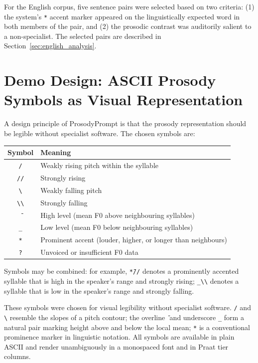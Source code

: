 For the English corpus, five sentence pairs were selected based on two
criteria: (1) the system's \texttt{*} accent marker appeared on the
linguistically expected word in both members of the pair, and (2) the prosodic
contrast was auditorily salient to a non-specialist. The selected pairs are
described in Section~\ref{sec:english_analysis}.

\section{Demo Design: ASCII Prosody Symbols as Visual Representation}
\label{sec:demo_design}

A design principle of ProsodyPrompt is that the prosody representation should be
legible without specialist software. The chosen symbols are:

\begin{center}
\begin{tabular}{cl}
\hline
Symbol & Meaning \\
\hline
\texttt{/}  & Weakly rising pitch within the syllable \\
\texttt{//} & Strongly rising \\
\texttt{\textbackslash}  & Weakly falling pitch \\
\texttt{\textbackslash\textbackslash} & Strongly falling \\
\texttt{{\={}}} & High level (mean F0 above neighbouring syllables) \\
\texttt{\_} & Low level (mean F0 below neighbouring syllables) \\
\texttt{*}  & Prominent accent (louder, higher, or longer than neighbours) \\
\texttt{?}  & Unvoiced or insufficient F0 data \\
\hline
\end{tabular}
\end{center}

Symbols may be combined: for example, \texttt{*{\={}}//} denotes a prominently
accented syllable that is high in the speaker's range and strongly rising; \texttt{\_\textbackslash\textbackslash}
denotes a syllable that is low in the speaker's range and strongly falling.

These symbols were chosen for visual legibility without specialist software.
\texttt{/} and \texttt{\textbackslash} resemble the slopes of a pitch contour;
the overline \texttt{{\={}}} and underscore \texttt{\_} form a natural pair
marking height above and below the local mean; \texttt{*} is a conventional
prominence marker in linguistic notation. All symbols are available in plain
ASCII and render unambiguously in a monospaced font and in Praat tier columns.


